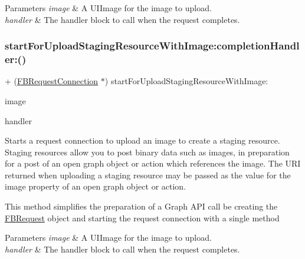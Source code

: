 \begin{DoxyParams}{Parameters}
{\em image} & A {\ttfamily U\+I\+Image} for the image to upload. \\
\hline
{\em handler} & The handler block to call when the request completes. \\
\hline
\end{DoxyParams}
\mbox{\label{interfaceFBRequestConnection_a930bc2fc6bfff73c3d98d15e6c84a5f9}} 
\subsubsection{\texorpdfstring{start\+For\+Upload\+Staging\+Resource\+With\+Image\+:completion\+Handler\+:()}{startForUploadStagingResourceWithImage:completionHandler:()}\hspace{0.1cm}{\footnotesize\ttfamily [5/5]}}
{\footnotesize\ttfamily + (\hyperlink{interfaceFBRequestConnection}{F\+B\+Request\+Connection} $\ast$) start\+For\+Upload\+Staging\+Resource\+With\+Image\+: \begin{DoxyParamCaption}\item[{(U\+I\+Image $\ast$)}]{image }\item[{completionHandler:(F\+B\+Request\+Handler)}]{handler }\end{DoxyParamCaption}}

Starts a request connection to upload an image to create a staging resource. Staging resources allow you to post binary data such as images, in preparation for a post of an open graph object or action which references the image. The U\+RI returned when uploading a staging resource may be passed as the value for the image property of an open graph object or action.

This method simplifies the preparation of a Graph A\+PI call be creating the \hyperlink{interfaceFBRequest}{F\+B\+Request} object and starting the request connection with a single method


\begin{DoxyParams}{Parameters}
{\em image} & A {\ttfamily U\+I\+Image} for the image to upload. \\
\hline
{\em handler} & The handler block to call when the request completes. \\
\hline
\end{DoxyParams}
\mbox{\label{interfaceFBRequestConnection_ad5b57e64c614dcb04a71e62ee11a87d5}} 
